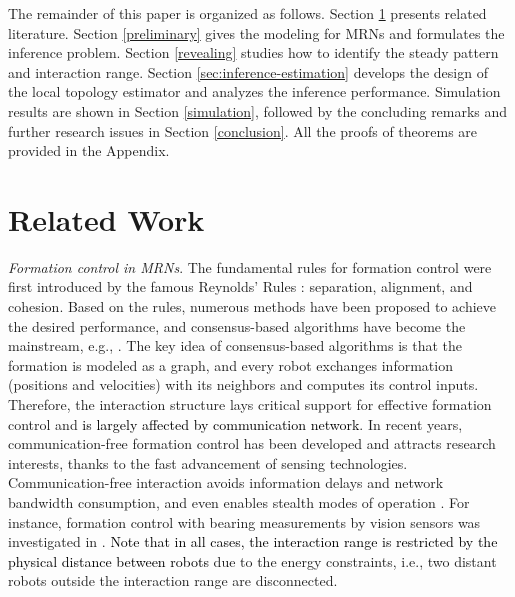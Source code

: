 \documentclass[12pt,journal,draftclsnofoot,onecolumn]{IEEEtran}
\begin{document}
The remainder of this paper is organized as follows. 
Section \ref{r-work} presents related literature. 
Section \ref{preliminary} gives the modeling for MRNs and formulates the inference problem. 
Section \ref{revealing} studies how to identify the steady pattern and interaction range. 
Section \ref{sec:inference-estimation} develops the design of the local topology estimator and analyzes the inference performance. 
Simulation results are shown in Section \ref{simulation}, 
followed by the concluding remarks and further research issues in Section \ref{conclusion}. 
All the proofs of theorems are provided in the Appendix. 



\section{Related Work}\label{r-work}
\textit{Formation control in MRNs}. 
The fundamental rules for formation control were first introduced by the famous Reynolds' Rules \cite{reynolds1987flocks}: separation, alignment, and cohesion. 
Based on the rules, numerous methods have been proposed to achieve the desired performance, and consensus-based algorithms have become the mainstream, e.g., \cite{sun2016optimal,zhao2018affine,alonso2019distributed,xu2020affine}. 
The key idea of consensus-based algorithms is that the formation is modeled as a graph, and every robot exchanges information (positions and velocities) with its neighbors and computes its control inputs. 
Therefore, the interaction structure lays critical support for effective formation control and \textcolor{black}{is largely affected by communication network}. 
In recent years, communication-free formation control \cite{deghat2014localization,cheng2017event,trinh2018bearing} has been developed and attracts research interests, thanks to the fast advancement of sensing technologies. 
Communication-free interaction avoids information delays and network bandwidth consumption, and even enables stealth modes of operation \cite{kan2011network}. 
For instance, formation control with bearing measurements by vision sensors was investigated in \cite{zhao2019bearing}. 
\textcolor{black}{Note that in all cases, the interaction range is restricted by the physical distance between robots} due to the energy constraints, i.e., two distant robots outside the interaction range are disconnected. 
\end{document}
